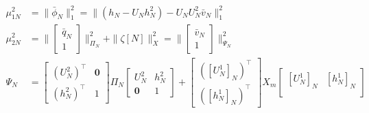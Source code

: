 \begin{subequations}
\begin{align}
\mu_{1N}^2 & = \|\bar{\phi}_N\|_1^2 = \|(h_N - U_N h_N^2) -U_N U_N^2 \bar{v}_N\|_1^2 \\
\mu_{2N}^2 & = \|\begin{bmatrix}
    \bar{q}_N \\ 1
    \end{bmatrix} \|_{\Pi_N}^2 + \|\zeta[N]\|_X^2
= \|\begin{bmatrix}
    \bar{v}_N \\ 1
    \end{bmatrix} \|_{\Psi_N}^2 \\
\Psi_N & = 
\begin{bmatrix}
    (U_N^2)^\top & \mathbf{0} \\
    (h_N^2)^\top & 1
\end{bmatrix} \Pi_N
\begin{bmatrix}
    U_N^2 & h_N^2 \\
    \mathbf{0} & 1
\end{bmatrix} + \begin{bmatrix}
    ([U_N^1]_N)^\top\\
    ([h_N^1]_N)^\top
\end{bmatrix} 
{X_m}
\begin{bmatrix}
    [U_N^1]_N & [h_N^1]_N \\
\end{bmatrix}    
\end{align}
\end{subequations}


